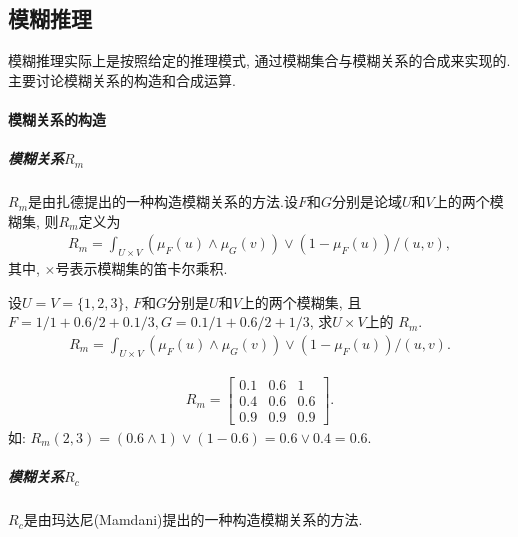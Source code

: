 \subsection{模糊推理}
模糊推理实际上是按照给定的推理模式, 通过模糊集合与模糊关系的合成来实现的. 主要讨论模糊关系的构造和合成运算.

\paragraph{模糊关系的构造}
\subparagraph{\textbf{模糊关系$R_m$}}

$R_m$是由扎德提出的一种构造模糊关系的方法.设$F$和$G$分别是论域$U$和$V$上的两个模糊集, 则$R_m$定义为
\begin{align}
  R_{m}=\int_{U \times V}\left(\mu_{F}(u) \wedge \mu_{G}(v)\right) \vee\left(1-\mu_{F}(u)\right) /(u, v),
\end{align}
其中, $\times$号表示模糊集的笛卡尔乘积.
\begin{example}\label{AIFuzzyexamp654}
 设$U=V=\{1,2,3\}$, $F$和$G$分别是$U$和$V$上的两个模糊集, 且$F=1/1+0.6/2+0.1/3,G=0.1/1+0.6/2+1/3$, 求$U\times V$上的 $R_m$.
\begin{align*}
    R_{m}=\int_{U \times V}\left(\mu_{F}(u) \wedge \mu_{G}(v)\right) \vee\left(1-\mu_{F}(u)\right) /(u, v).
\end{align*}
\vspace{-0.3cm}
\end{example}
\begin{result}
\begin{align*}
    R_{m}=\left[\begin{array}{ccc}{0.1} & {0.6} & {1} \\ {0.4} & {0.6} & {0.6} \\ {0.9} & {0.9} & {0.9}\end{array}\right].
\end{align*}
如: $R_m(2, 3) =(0.6\wedge 1)\vee (1-0.6)=0.6\vee 0.4=0.6$.
\end{result}
\subparagraph{模糊关系$R_c$}
$R_c$是由玛达尼(Mamdani)提出的一种构造模糊关系的方法.

